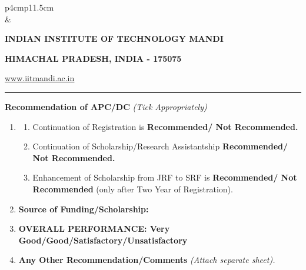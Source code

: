 \documentclass[12 pt, a4paper]{article}
\newcommand{\HRule}{\rule{\linewidth}{1mm}}
\begin{document}





\pagestyle{empty}
\vskip 0.2cm
	\begin{tabular}{p{4cm}p{11.5cm}}
		  \\
		& \centering \large\bf\phantom{Empty line}\\ 
		\rule{0pt}{1pt} \centering \large\bf{INDIAN INSTITUTE OF TECHNOLOGY MANDI} \\
		\rule{0pt}{1pt} \centering \large\bf{HIMACHAL PRADESH, INDIA - 175075} \\
		\rule{0pt}{1pt} \centering \underline{\href{www.iitmandi.ac.in}{www.iitmandi.ac.in}}\\
	\end{tabular}
\noindent

{\raggedleft{}\HRule}
\textbf{Recommendation of APC/DC} \textit{(Tick Appropriately)}
\begin{enumerate}
	\item
	\begin{enumerate}
\item Continuation of Registration is \textbf{Recommended/ Not Recommended.}
\item Continuation of Scholarship/Research Assistantship \textbf{ Recommended/ Not Recommended.}
\item Enhancement of Scholarship from JRF to SRF is \textbf{Recommended/ Not Recommended } (only
after Two Year of Registration).
\end{enumerate}
\item
\textbf{Source of Funding/Scholarship:}

\item \textbf{OVERALL PERFORMANCE: Very Good/Good/Satisfactory/Unsatisfactory}
\item \textbf{Any Other Recommendation/Comments} \textit{(Attach separate sheet).}
\end{enumerate}
\vspace*{0.5cm}
\end{document}
